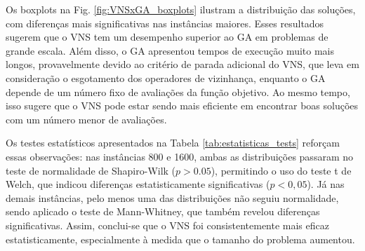 \documentclass[conference]{IEEEtran}
\begin{document}


Os boxplots na Fig. \ref{fig:VNSxGA_boxplots} ilustram a distribuição das soluções, com diferenças mais significativas nas instâncias maiores. Esses resultados 
sugerem que o VNS tem um desempenho superior ao GA em problemas de grande escala. Além disso, o GA apresentou tempos de execução muito mais longos, provavelmente 
devido ao critério de parada adicional do VNS, que leva em consideração o esgotamento dos operadores de vizinhança, enquanto o GA depende de um número fixo de 
avaliações da função objetivo. Ao mesmo tempo, isso sugere que o VNS pode estar sendo mais eficiente em encontrar boas soluções com um número menor de avaliações. 

Os testes estatísticos apresentados na Tabela \ref{tab:estatisticas_tests} reforçam essas observações: nas instâncias 800 e 1600, ambas as distribuições passaram no teste de normalidade de Shapiro-Wilk 
($p > 0.05$), permitindo o uso do teste t de Welch, que indicou diferenças estatisticamente significativas ($p < 0{,}05$). Já nas demais instâncias, pelo menos 
uma das distribuições não seguiu normalidade, sendo aplicado o teste de Mann-Whitney, que também revelou diferenças significativas. Assim, conclui-se que o VNS 
foi consistentemente mais eficaz estatisticamente, especialmente à medida que o tamanho do problema aumentou.
\end{document}
